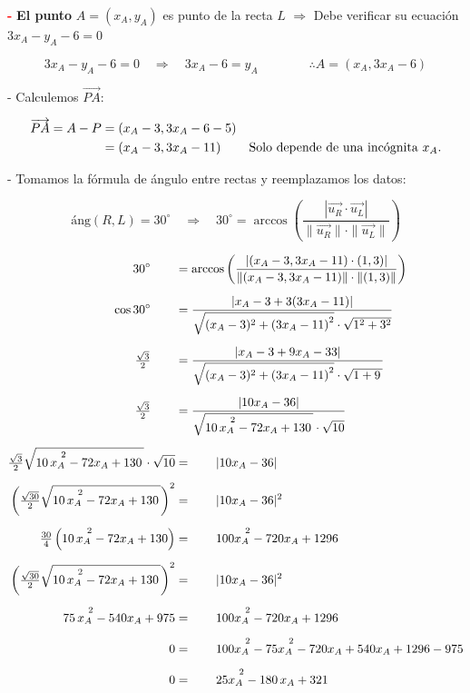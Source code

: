 \documentclass[11pt]{article}
\begin{document}
\begin{enumerate}[\hspace{-5mm} 1) ]
\begin{enumerate}[(a)]
    \textcolor{red}{\textbf{-}} \textbf{El punto} $ A = (x_A, y_A) $ es punto de la recta $ L $ $\Rightarrow$ Debe verificar su ecuación $ 3x_A -y_A - 6 = 0 $

\[
3x_A -y_A - 6 = 0 
\quad 
\Longrightarrow
\quad
3x_A  - 6 =  y_A   
\qquad
\qquad
\therefore A = \left( x_A, 3x_A  - 6  \right)
\]

\noindent
- Calculemos  $ \overrightarrow{PA}$:

\begin{align*}
    \overrightarrow{PA} = A - P 
    &= \left( x_A - 3, 3x_A  - 6 -5\right)
    \\
     &= \left( x_A - 3, 3x_A  - 11\right) &\text{Solo depende de una incógnita $ x_A $.}
\end{align*} 

\noindent
- Tomamos la fórmula de ángulo entre rectas y reemplazamos los datos:

\[
\text{áng}(R, L) = 30^\circ 
\quad \Rightarrow \quad 
30^\circ = \arccos \left( \frac{|\overrightarrow{u_{R}} \cdot \overrightarrow{u_L}|}{\|\overrightarrow{u_{R}}\| \cdot \|\overrightarrow{u_L}\|} \right)
\]

\begin{align*}
    30^\circ \qquad &= \arccos \left( \frac{|(x_A - 3, 3x_A  -11) \cdot (1,3)|}{\|(x_A - 3, 3x_A  - 11)\| \cdot \|(1,3)\|} \right) 
    \\[2mm] 
    \cos 30^\circ \qquad &= \frac{| x_A -3 + 3(3x_A  - 11) |}{\sqrt{(x_A - 3)^2 + \left( 3x_A  - 11\right)^2} \cdot \sqrt{1^2 + 3^2}} 
    \\[2mm]  
    \tfrac{\sqrt{3}}{2} \qquad &= \frac{| x_A -3 + 9x_A  - 33 |}{\sqrt{(x_A - 3)^2 + \left( 3x_A  - 11\right)^2} \cdot \sqrt{1 + 9\, }} 
    \\[2mm]  
    \tfrac{\sqrt{3}}{2} \qquad &= \frac{| 10x_A  -36 |}{\sqrt{10\, x_{A}\!\! \rule{0mm}{3.5mm}^2 -72 x_A +130\, }\cdot \sqrt{10}} 
    \\[2mm]      
    \tfrac{\sqrt{3}}{2} \sqrt{10\, x_{A}\!\! \rule{0mm}{3.5mm}^2 -72 x_A +130\,  }\cdot \sqrt{10}&= \qquad  | 10x_A  -36 |  
    \\[2mm]     
   \left( \tfrac{\sqrt{30}}{2} \sqrt{10\, x_{A}\!\! \rule{0mm}{3.5mm}^2 -72 x_A +130\,  }  \right) ^2 &= \qquad  | 10x_A  -36 | ^2
    \\[2mm]    
    \tfrac{30}{4} \left( 10\, x_{A}\!\! \rule{0mm}{3.5mm}^2 -72 x_A +130 \right) &= \qquad  100 x_{A}\!\! \rule{0mm}{3.5mm}^2 -720x_A + 1296 
    \\[2mm]     
   \left( \tfrac{\sqrt{30}}{2} \sqrt{10\, x_{A}\!\! \rule{0mm}{3.5mm}^2 -72 x_A +130\,  }  \right) ^2 &= \qquad  | 10x_A  -36 | ^2
    \\[2mm]    
    75\, x_{A}\!\! \rule{0mm}{3.5mm}^2 - 540 x_A + 975 &= \qquad  100 x_{A}\!\! \rule{0mm}{3.5mm}^2 -720x_A + 1296 
    \\[2mm]    
    0  &= \qquad  100 x_{A}\!\! \rule{0mm}{3.5mm}^2-75  x_{A}\!\! \rule{0mm}{3.5mm}^2 -720x_A  +  540 x_A  + 1296 -975
    \\[2mm]    
    0  &= \qquad  25 x_{A}\!\! \rule{0mm}{3.5mm}^2 -180 \, x_{A}   + 321
\end{align*}


\end{enumerate}
\end{enumerate}
\end{document}
